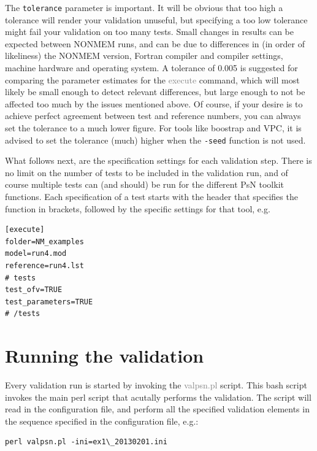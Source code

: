 \documentclass[a4,11pt]{report} \usepackage[pdftex]{graphicx}
\newcommand{\psn}[1]{\textcolor{Grey}{#1}}
\begin{document}
\vspace{5pt}
\noindent The {\tt tolerance} parameter is important. It will be
obvious that too high a tolerance will render your validation
unuseful, but specifying a too low tolerance might fail your
validation on too many tests. Small changes in results can be expected
between NONMEM runs, and can be due to differences in (in order of
likeliness) the NONMEM version, Fortran compiler and compiler
settings, machine hardware and operating system. A tolerance of 0.005
is suggested for comparing the parameter estimates for the
\psn{execute} command, which will most likely be small enough to
detect relevant differences, but large enough to not be affected too
much by the issues mentioned above. Of course, if your desire is to
achieve perfect agreement between test and reference numbers, you can
always set the tolerance to a much lower figure. For tools like
boostrap and VPC, it is advised to set the tolerance (much) higher
when the {\tt -seed} function is not used.

\vspace{5pt}

\noindent What follows next, are the specification settings for each
validation step. There is no limit on the number of tests to be
included in the validation run, and of course multiple tests can (and
should) be run for the different PsN toolkit functions. Each
specification of a test starts with the header that specifies the function
in brackets, followed by the specific settings for that tool, e.g.

\begin{lstlisting}
[execute]
folder=NM_examples
model=run4.mod
reference=run4.lst
# tests
test_ofv=TRUE
test_parameters=TRUE
# /tests
\end{lstlisting}

\newpage

\section{Running the validation}

Every validation run is started by invoking the \psn{valpsn.pl}
script. This bash script invokes the main perl script that acutally
performs the validation. The script will read in the configuration
file, and perform all the specified validation elements in the
sequence specified in the configuration file, e.g.:

\begin{lstlisting}
perl valpsn.pl -ini=ex1\_20130201.ini
\end{lstlisting}
\end{document}
